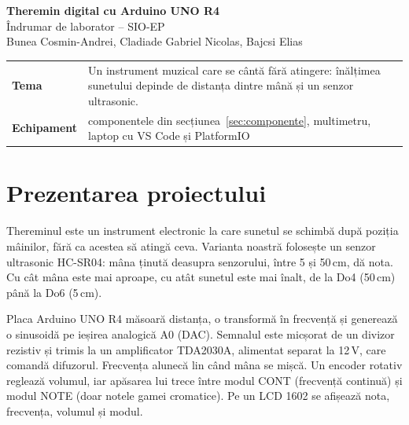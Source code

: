 \documentclass[11pt,a4paper]{article}
\newcommand{\echipa}{Bunea Cosmin-Andrei, Cladiade Gabriel Nicolas, Bajcsi Elias}
\begin{document}
\begin{center}
  {\Large\bfseries Theremin digital cu Arduino UNO R4}\\[5pt]
  {\large Îndrumar de laborator -- SIO-EP}\\[5pt]
  {\small \echipa}
\end{center}

\begin{center}
\begin{tabularx}{\textwidth}{@{}>{\bfseries}l X@{}}
\toprule
Tema & Un instrument muzical care se cântă fără atingere: înălțimea sunetului depinde de distanța dintre mână și un senzor ultrasonic. \\
Echipament & componentele din secțiunea~\ref{sec:componente}, multimetru, laptop cu VS Code și PlatformIO \\
\bottomrule
\end{tabularx}
\end{center}

\section{Prezentarea proiectului}

Thereminul este un instrument electronic la care sunetul se schimbă după poziția mâinilor, fără ca acestea să atingă ceva. Varianta noastră folosește un senzor ultrasonic HC-SR04: mâna ținută deasupra senzorului, între 5 și 50\,cm, dă nota. Cu cât mâna este mai aproape, cu atât sunetul este mai înalt, de la Do4 (50\,cm) până la Do6 (5\,cm).

Placa Arduino UNO R4 măsoară distanța, o transformă în frecvență și generează o sinusoidă pe ieșirea analogică A0 (DAC). Semnalul este micșorat de un divizor rezistiv și trimis la un amplificator TDA2030A, alimentat separat la 12\,V, care comandă difuzorul. Frecvența alunecă lin când mâna se mișcă. Un encoder rotativ reglează volumul, iar apăsarea lui trece între modul CONT (frecvență continuă) și modul NOTE (doar notele gamei cromatice). Pe un LCD 1602 se afișează nota, frecvența, volumul și modul.
\end{document}

